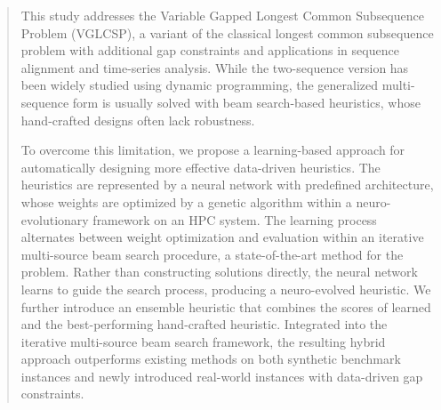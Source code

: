 \documentclass[runningheads]{llncs}
\begin{document}
\begin{abstract}
	

This study addresses the Variable Gapped Longest Common Subsequence Problem (VGLCSP), a variant of the classical longest common subsequence problem with additional gap constraints and applications in sequence alignment and time-series analysis. While the two-sequence version has been widely studied using dynamic programming, the generalized multi-sequence form is usually solved with beam search-based heuristics, whose hand-crafted designs often lack robustness.

To overcome this limitation, we propose a learning-based approach for automatically designing more effective data-driven heuristics. The heuristics are represented by a neural network with predefined architecture, whose weights are optimized by a genetic algorithm within a neuro-evolutionary framework on an HPC system. The learning process alternates between weight optimization and evaluation within an iterative multi-source beam search procedure, a state-of-the-art method for the problem. Rather than constructing solutions directly, the neural network learns to guide the search process, producing a neuro-evolved heuristic. We further introduce an ensemble heuristic that combines the scores of learned and the best-performing hand-crafted heuristic. Integrated into the iterative multi-source beam search framework, the resulting hybrid approach outperforms existing methods on both synthetic benchmark instances and newly introduced real-world instances with data-driven gap constraints.
\end{abstract}
\end{document}
